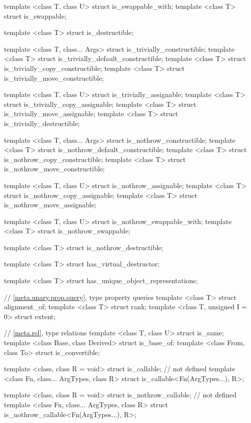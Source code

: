 \begin{codeblock}
{  template <class T, class U> struct is_swappable_with;
  template <class T> struct is_swappable;

  template <class T> struct is_destructible;

  template <class T, class... Args> struct is_trivially_constructible;
  template <class T> struct is_trivially_default_constructible;
  template <class T> struct is_trivially_copy_constructible;
  template <class T> struct is_trivially_move_constructible;

  template <class T, class U> struct is_trivially_assignable;
  template <class T> struct is_trivially_copy_assignable;
  template <class T> struct is_trivially_move_assignable;
  template <class T> struct is_trivially_destructible;

  template <class T, class... Args> struct is_nothrow_constructible;
  template <class T> struct is_nothrow_default_constructible;
  template <class T> struct is_nothrow_copy_constructible;
  template <class T> struct is_nothrow_move_constructible;

  template <class T, class U> struct is_nothrow_assignable;
  template <class T> struct is_nothrow_copy_assignable;
  template <class T> struct is_nothrow_move_assignable;

  template <class T, class U> struct is_nothrow_swappable_with;
  template <class T> struct is_nothrow_swappable;

  template <class T> struct is_nothrow_destructible;

  template <class T> struct has_virtual_destructor;

  template <class T> struct has_unique_object_representations;

  // \ref{meta.unary.prop.query}, type property queries
  template <class T> struct alignment_of;
  template <class T> struct rank;
  template <class T, unsigned I = 0> struct extent;

  // \ref{meta.rel}, type relations
  template <class T, class U> struct is_same;
  template <class Base, class Derived> struct is_base_of;
  template <class From, class To> struct is_convertible;

  template <class, class R = void> struct is_callable; // not defined
  template <class Fn, class... ArgTypes, class R>
    struct is_callable<Fn(ArgTypes...), R>;

  template <class, class R = void> struct is_nothrow_callable; // not defined
  template <class Fn, class... ArgTypes, class R>
    struct is_nothrow_callable<Fn(ArgTypes...), R>;

}
\end{codeblock}
